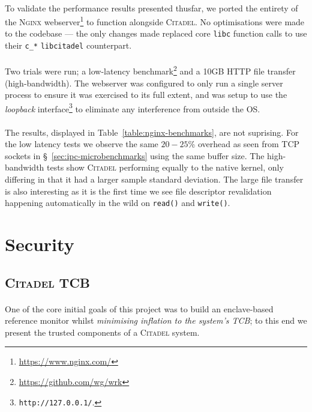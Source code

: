 \paragraph{} To validate the performance results presented thusfar, we ported the entirety of the \textsc{Nginx} webserver\footnote{\url{https://www.nginx.com/}} to function alongside \textsc{Citadel}. No optimisations were made to the codebase --- the only changes made replaced core \texttt{libc} function calls to use their \texttt{c\_*} \texttt{libcitadel} counterpart.

\paragraph{} Two trials were run; a low-latency benchmark\footnote{\url{https://github.com/wg/wrk}} and a 10GB HTTP file transfer (high-bandwidth). The webserver was configured to only run a single server process to ensure it was exercised to its full extent, and was setup to use the \textit{loopback} interface\footnote{\texttt{http://127.0.0.1/}.} to eliminate any interference from outside the OS. 

\paragraph{} The results, displayed in Table~\ref{table:nginx-benchmarks}, are not suprising. For the low latency tests we observe the same $20-25$\% overhead as seen from TCP sockets in §~\ref{sec:ipc-microbenchmarks} using the same buffer size. The high-bandwidth tests show \textsc{Citadel} performing equally to the native kernel, only differing in that it had a larger sample standard deviation. The large file transfer is also interesting as it is the first time we see file descriptor revalidation happening automatically in the wild on \texttt{read()} and \texttt{write()}. 





\section{Security}

\subsection{\textsc{Citadel} TCB}

\paragraph{} One of the core initial goals of this project was to build an enclave-based reference monitor whilst \textit{minimising inflation to the system's TCB}; to this end we present the trusted components of a \textsc{Citadel} system.

